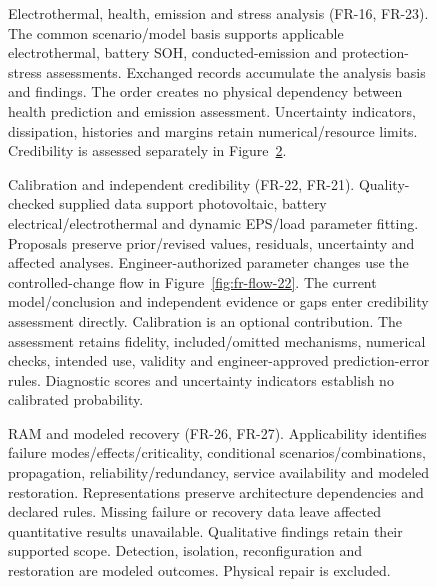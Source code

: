 \begin{figure}[H]
\centering
{}
\caption[Electrothermal, health, emission and stress analysis.]{Electrothermal, health, emission and stress analysis (FR-16, FR-23). The common scenario/model basis supports applicable electrothermal, battery SOH, conducted-emission and protection-stress assessments. Exchanged records accumulate the analysis basis and findings. The order creates no physical dependency between health prediction and emission assessment. Uncertainty indicators, dissipation, histories and margins retain numerical/resource limits. Credibility is assessed separately in Figure~\ref{fig:fr-flow-14}.}
\label{fig:fr-flow-13}
\end{figure}
\clearpage

\begin{figure}[H]
\centering
{}
\caption[Calibration and independent credibility.]{Calibration and independent credibility (FR-22, FR-21). Quality-checked supplied data support photovoltaic, battery electrical/electrothermal and dynamic EPS/load parameter fitting. Proposals preserve prior/revised values, residuals, uncertainty and affected analyses. Engineer-authorized parameter changes use the controlled-change flow in Figure~\ref{fig:fr-flow-22}. The current model/conclusion and independent evidence or gaps enter credibility assessment directly. Calibration is an optional contribution. The assessment retains fidelity, included/omitted mechanisms, numerical checks, intended use, validity and engineer-approved prediction-error rules. Diagnostic scores and uncertainty indicators establish no calibrated probability.}
\label{fig:fr-flow-14}
\end{figure}
\clearpage

\begin{figure}[H]
\centering
{}
\caption[RAM and modeled recovery.]{RAM and modeled recovery (FR-26, FR-27). Applicability identifies failure modes/effects/criticality, conditional scenarios/combinations, propagation, reliability/redundancy, service availability and modeled restoration. Representations preserve architecture dependencies and declared rules. Missing failure or recovery data leave affected quantitative results unavailable. Qualitative findings retain their supported scope. Detection, isolation, reconfiguration and restoration are modeled outcomes. Physical repair is excluded.}
\label{fig:fr-flow-15}
\end{figure}
\clearpage

